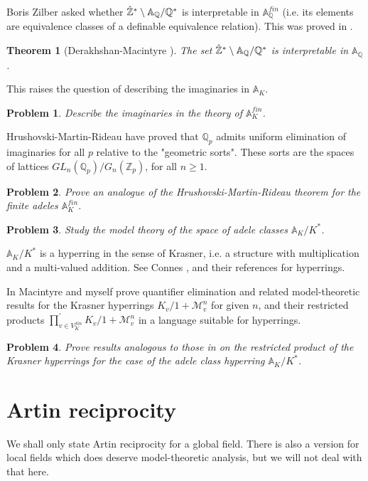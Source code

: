 \documentclass[12pt]{amsart}
\def\A{\mathbb{A}}
\def\Z{\mathbb{Z}}
\def\Q{\mathbb{Q}}
\def\cM{\mathcal M}
\newtheorem{thm}{Theorem}[section]
\numberwithin{equation}{section}
\newtheorem{prob}{Problem}[section]
\begin{document}
Boris Zilber asked whether $\hat{\Bbb Z}^*\setminus\A_{\Q} /\Q^{*}$ is interpretable 
in $\A_{\Q}^{fin}$ (i.e. its elements are equivalence classes of a definable equivalence relation). This was proved in \cite{DM}.

\begin{thm} [Derakhshan-Macintyre {\cite{DM-ad}}]The set $\hat{\Bbb Z}^*\setminus \A_{\Q} / \Q^*$ is interpretable in $\A_{\Q}$.\end{thm}

This raises the question of describing the imaginaries in $\A_K$. 

\begin{prob}\cite{DM-ad} Describe the imaginaries in the theory of $\A_K^{fin}$.\end{prob}

Hrushovski-Martin-Rideau \cite{HMR} have proved that $\Q_p$ admits uniform elimination of imaginaries for all $p$ relative to the "geometric sorts". These sorts are the spaces of lattices $GL_n(\Q_p)/G_n(\Z_p)$, for all $n\geq 1$. 
\begin{prob} \cite{DM-ad} Prove an analogue of the Hrushovski-Martin-Rideau theorem for the finite adeles $\A_K^{fin}$.\end{prob}


\begin{prob} \cite{DM-ad} Study the model theory of the space of adele classes $\A_K/K^*$.\end{prob}
$\A_K/K^*$ is 
a hyperring in the sense of Krasner, i.e. a structure with multiplication and a multi-valued addition. See Connes \cite{CC},\cite{CC2} and their references for hyperrings.

In \cite{DM-supp} Macintyre and myself prove quantifier elimination and related model-theoretic results for the Krasner hyperrings $K_v/1+\mathcal{M}_v^n$ for given $n$, and their restricted products $\prod_{v\in V_K^{fin}}^{'} K_v/1+\cM_v^n$ in a language suitable for hyperrings. 
\begin{prob} Prove results analogous to those in \cite{DM-supp} on the restricted product of the Krasner hyperrings for the case of the adele class hyperring $\A_K/K^*$.\end{prob}


\section{\bf Artin reciprocity}\label{ssec-artin} 

We shall only state Artin reciprocity for a global field. There is also a version for local fields which does deserve model-theoretic analysis, but we will not deal with that here.
\end{document}
